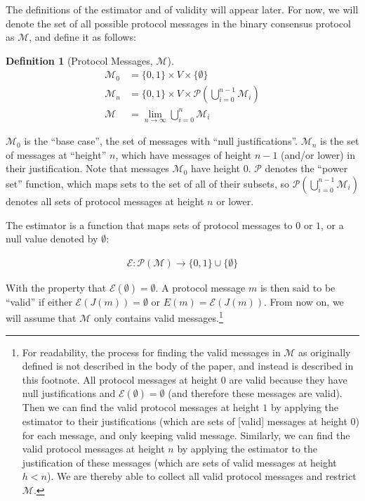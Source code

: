 \documentclass{article}
\theoremstyle{definition}
\newtheorem{defn}{Definition}[section]
\begin{document}
The definitions of the estimator and of validity will appear later. For now, we will denote the set of all possible protocol messages in the binary consensus protocol as $\mathcal{M}$, and define it as follows:

\begin{defn}[Protocol Messages, $\mathcal{M}$]
\begin{equation*}
\begin{split}
    \mathcal{M}_0 &= \{0, 1\} \times V \times \{\emptyset\}\\
    \mathcal{M}_n &= \{0, 1\} \times V \times \mathcal{P}(\bigcup_{i=0}^{n-1} \mathcal{M}_i)\\
    \mathcal{M} &= \lim_{n \to \infty} \bigcup_{i=0}^{n} \mathcal{M}_i
\end{split}
\end{equation*}
\end{defn}

$\mathcal{M}_0$ is the ``base case'', the set of messages with ``null justifications''. $\mathcal{M}_n$ is the set of messages at ``height'' $n$, which have messages of height $n-1$ (and/or lower) in their justification. Note that messages $\mathcal{M}_0$ have height $0$. $\mathcal{P}$ denotes the ``power set'' function, which maps sets to the set of all of their subsets, so $\mathcal{P}(\bigcup_{i=0}^{n-1} \mathcal{M}_i)$ denotes all sets of protocol messages at height $n$ or lower.
  
The estimator is a function that maps sets of protocol messages to $0$ or $1$, or a null value denoted by $\emptyset$:
  
\begin{equation*}
\begin{split}
    \mathcal{E}:\mathcal{P}(\mathcal{M}) \to \{0, 1\} \cup \{\emptyset\}
\end{split}
\end{equation*}

With the property that $\mathcal{E}(\emptyset) = \emptyset$. A protocol message $m$ is then said to be ``valid'' if either $\mathcal{E}(J(m)) = \emptyset$ or $E(m) = \mathcal{E}(J(m))$. From now on, we will assume that $\mathcal{M}$ only contains valid messages.\footnote{For readability, the process for finding the valid messages in $\mathcal{M}$ as originally defined is not described in the body of the paper, and instead is described in this footnote. All protocol messages at height $0$ are valid because they have null justifications and $\mathcal{E}(\emptyset) = \emptyset$ (and therefore these messages are valid). Then we can find the valid protocol messages at height $1$ by applying the estimator to their justifications (which are sets of [valid] messages at height 0) for each message, and only keeping valid message. Similarly, we can find the valid protocol messages at height $n$ by applying the estimator to the justification of these messages (which are sets of valid messages at height $h < n$). We are thereby able to collect all valid protocol messages and restrict $\mathcal{M}.$}
\end{document}
